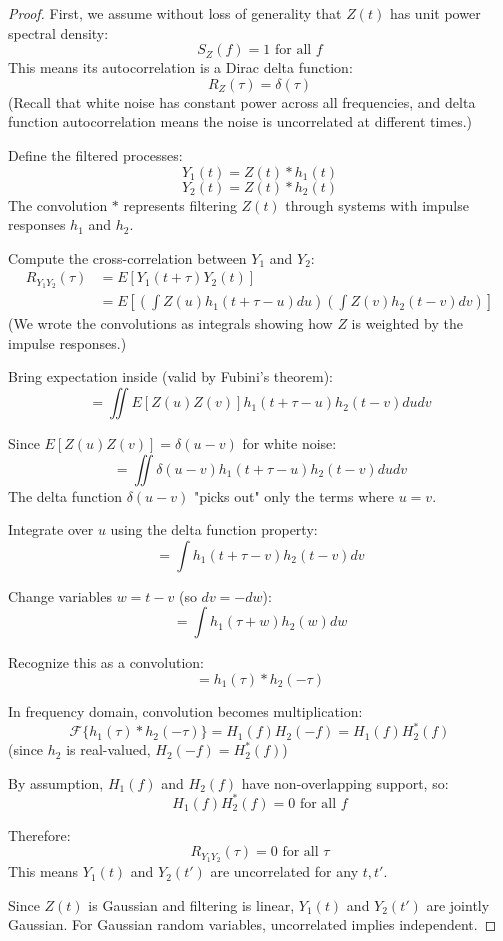 \documentclass[../main.tex]{subfiles}
\begin{document}
\begin{proof}
    

First, we assume without loss of generality that $Z(t)$ has unit power spectral density:
\[ S_Z(f) = 1 \text{ for all } f \]
This means its autocorrelation is a Dirac delta function:
\[ R_Z(\tau) = \delta(\tau) \]
(Recall that white noise has constant power across all frequencies, and delta function autocorrelation means the noise is uncorrelated at different times.)

Define the filtered processes:
\[ Y_1(t) = Z(t) * h_1(t) \]
\[ Y_2(t) = Z(t) * h_2(t) \]
The convolution $*$ represents filtering $Z(t)$ through systems with impulse responses $h_1$ and $h_2$.

Compute the cross-correlation between $Y_1$ and $Y_2$:
\begin{align*}
R_{Y_1Y_2}(\tau) &= E[Y_1(t+\tau)Y_2(t)] \\
&= E\left[\left(\int Z(u)h_1(t+\tau-u)du\right)\left(\int Z(v)h_2(t-v)dv\right)\right]
\end{align*}
(We wrote the convolutions as integrals showing how $Z$ is weighted by the impulse responses.)

Bring expectation inside (valid by Fubini's theorem):
\[ = \iint E[Z(u)Z(v)]h_1(t+\tau-u)h_2(t-v)dudv \]

Since $E[Z(u)Z(v)] = \delta(u-v)$ for white noise:
\[ = \iint \delta(u-v)h_1(t+\tau-u)h_2(t-v)dudv \]
The delta function $\delta(u-v)$ "picks out" only the terms where $u=v$.

Integrate over $u$ using the delta function property:
\[ = \int h_1(t+\tau-v)h_2(t-v)dv \]

Change variables $w = t-v$ (so $dv = -dw$):
\[ = \int h_1(\tau + w)h_2(w)dw \]

Recognize this as a convolution:
\[ = h_1(\tau) * h_2(-\tau) \]

In frequency domain, convolution becomes multiplication:
\[ \mathcal{F}\{h_1(\tau)*h_2(-\tau)\} = H_1(f)H_2(-f) = H_1(f)H_2^*(f) \]
(since $h_2$ is real-valued, $H_2(-f) = H_2^*(f)$)

By assumption, $H_1(f)$ and $H_2(f)$ have non-overlapping support, so:
\[ H_1(f)H_2^*(f) = 0 \text{ for all } f \]

Therefore:
\[ R_{Y_1Y_2}(\tau) = 0 \text{ for all } \tau \]
This means $Y_1(t)$ and $Y_2(t')$ are uncorrelated for any $t,t'$.

Since $Z(t)$ is Gaussian and filtering is linear, $Y_1(t)$ and $Y_2(t')$ are jointly Gaussian. For Gaussian random variables, uncorrelated implies independent.


\end{proof}
\end{document}
